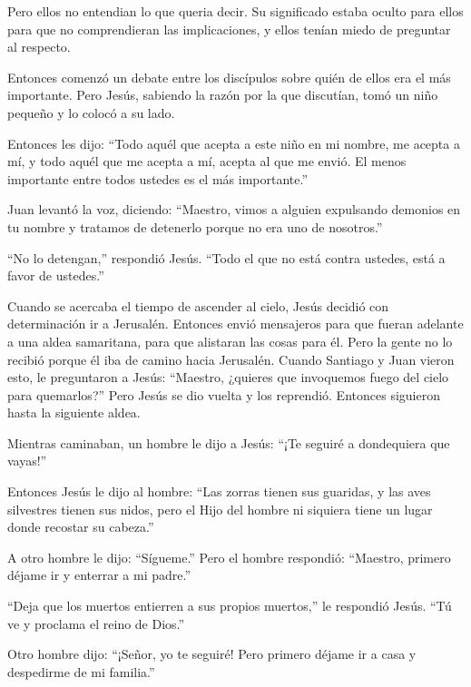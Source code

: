  Pero ellos no entendian lo que queria decir. Su
significado estaba oculto para ellos para que no comprendieran las
implicaciones, y ellos tenían miedo de preguntar al respecto.

 Entonces comenzó un debate entre los discípulos sobre
quién de ellos era el más importante.  Pero Jesús, sabiendo
la razón por la que discutían, tomó un niño pequeño y lo colocó a su
lado.

 Entonces les dijo: ``Todo aquél que acepta a este niño en
mi nombre, me acepta a mí, y todo aquél que me acepta a mí, acepta al
que me envió. El menos importante entre todos ustedes es el más
importante.''

 Juan levantó la voz, diciendo: ``Maestro, vimos a alguien
expulsando demonios en tu nombre y tratamos de detenerlo porque no era
uno de nosotros.''

 ``No lo detengan,'' respondió Jesús. ``Todo el que no está
contra ustedes, está a favor de ustedes.''

 Cuando se acercaba el tiempo de ascender al cielo, Jesús
decidió con determinación ir a Jerusalén.  Entonces envió
mensajeros para que fueran adelante a una aldea samaritana, para que
alistaran las cosas para él.  Pero la gente no lo recibió
porque él iba de camino hacia Jerusalén.  Cuando Santiago y
Juan vieron esto, le preguntaron a Jesús: ``Maestro, ¿quieres que
invoquemos fuego del cielo para quemarlos?''  Pero Jesús se
dio vuelta y los reprendió.  Entonces siguieron hasta la
siguiente aldea.

 Mientras caminaban, un hombre le dijo a Jesús: ``¡Te
seguiré a dondequiera que vayas!''

 Entonces Jesús le dijo al hombre: ``Las zorras tienen sus
guaridas, y las aves silvestres tienen sus nidos, pero el Hijo del
hombre ni siquiera tiene un lugar donde recostar su cabeza.''

 A otro hombre le dijo: ``Sígueme.'' Pero el hombre
respondió: ``Maestro, primero déjame ir y enterrar a mi padre.''

 ``Deja que los muertos entierren a sus propios muertos,''
le respondió Jesús. ``Tú ve y proclama el reino de Dios.''

 Otro hombre dijo: ``¡Señor, yo te seguiré! Pero primero
déjame ir a casa y despedirme de mi familia.''

